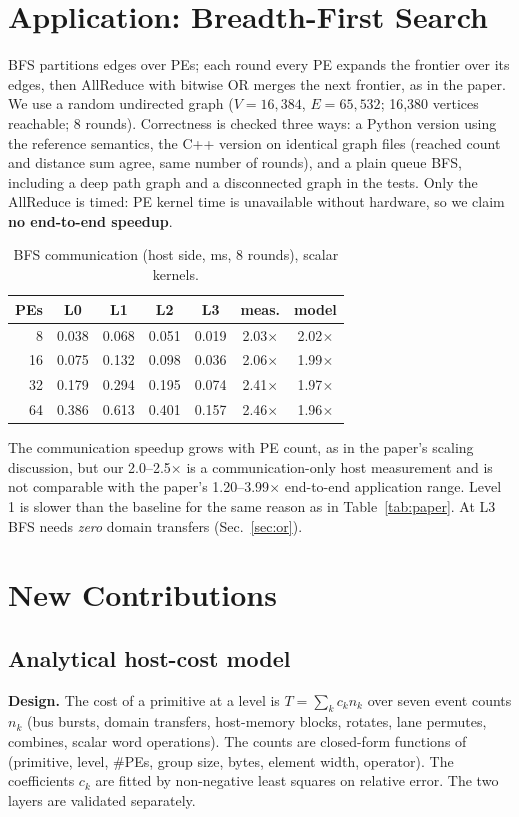 \documentclass[conference]{IEEEtran}
\begin{document}
\section{Application: Breadth-First Search}
BFS partitions edges over PEs; each round every PE expands the frontier over its edges, then AllReduce with bitwise OR merges the next frontier, as in the paper. We use a random undirected graph ($V{=}16{,}384$, $E{=}65{,}532$; 16,380 vertices reachable; 8 rounds). Correctness is checked three ways: a Python version using the reference semantics, the C++ version on identical graph files (reached count and distance sum agree, same number of rounds), and a plain queue BFS, including a deep path graph and a disconnected graph in the tests. Only the AllReduce is timed: PE kernel time is unavailable without hardware, so we claim \textbf{no end-to-end speedup}.
\begin{table}[t]\centering\caption{BFS communication (host side, ms, 8 rounds), scalar kernels.}\label{tab:bfs}\footnotesize
\begin{tabular}{@{}rcccccc@{}}\toprule PEs & L0 & L1 & L2 & L3 & meas. & model\\\midrule
8&0.038&0.068&0.051&0.019&2.03$\times$&2.02$\times$\\16&0.075&0.132&0.098&0.036&2.06$\times$&1.99$\times$\\32&0.179&0.294&0.195&0.074&2.41$\times$&1.97$\times$\\64&0.386&0.613&0.401&0.157&2.46$\times$&1.96$\times$\\\bottomrule\end{tabular}\end{table}
The communication speedup grows with PE count, as in the paper's scaling discussion, but our 2.0--2.5$\times$ is a communication-only host measurement and is not comparable with the paper's 1.20--3.99$\times$ end-to-end application range. Level 1 is slower than the baseline for the same reason as in Table~\ref{tab:paper}. At L3 BFS needs \emph{zero} domain transfers (Sec.~\ref{sec:or}).

\section{New Contributions}
\subsection{Analytical host-cost model}
\textbf{Design.} The cost of a primitive at a level is $T=\sum_k c_k n_k$ over seven event counts $n_k$ (bus bursts, domain transfers, host-memory blocks, rotates, lane permutes, combines, scalar word operations). The counts are closed-form functions of (primitive, level, \#PEs, group size, bytes, element width, operator). The coefficients $c_k$ are fitted by non-negative least squares on relative error. The two layers are validated separately.
\end{document}
